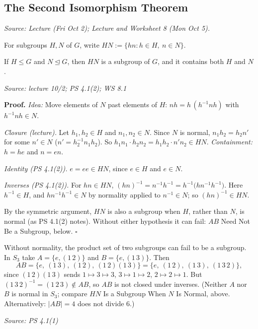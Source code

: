\documentclass[11pt]{report}
\renewenvironment{proof}[1][Proof]{\noindent\textbf{#1.} }{\hfill$\square$\par\vspace{5pt}}
\newcommand{\srcline}[1]{\par\hfill{\footnotesize\textit{Source: #1}}}
\begin{document}
\subsection{The Second Isomorphism Theorem}\label{sub:second-iso}

\textit{Source: Lecture (Fri Oct 2); Lecture and Worksheet 8 (Mon Oct 5).}

\begin{defbox}\label{def:product-set-hn}
For subgroups $H, N$ of $G$, write $HN := \{hn : h \in H,\ n \in N\}$.
\end{defbox}

\begin{lembox}\label{lem:hn-subgroup-when-n-normal}
If $H \leq G$ and $N \trianglelefteq G$, then $HN$ is a subgroup of $G$, and it contains both $H$ and $N$.
\srcline{lecture 10/2; PS 4.1(2); WS 8.1}
\end{lembox}

\begin{proof}
\textit{Idea:} Move elements of $N$ past elements of $H$: $nh = h\,(h^{-1}nh)$ with $h^{-1}nh \in N$.\par
\emph{Closure (lecture).} Let $h_1, h_2 \in H$ and $n_1, n_2 \in N$. Since $N$ is normal, $n_1h_2 = h_2n'$ for some $n' \in N$ ($n' = h_2^{-1}n_1h_2$). So $h_1n_1 \cdot h_2n_2 = h_1h_2 \cdot n'n_2 \in HN$. \emph{Containment:} $h = he$ and $n = en$.

\emph{Identity (PS 4.1(2)).} $e = ee \in HN$, since $e \in H$ and $e \in N$.

\emph{Inverses (PS 4.1(2)).} For $hn \in HN$, $(hn)^{-1} = n^{-1}h^{-1} = h^{-1}\big(hn^{-1}h^{-1}\big)$. Here $h^{-1} \in H$, and $hn^{-1}h^{-1} \in N$ by normality applied to $n^{-1} \in N$; so $(hn)^{-1} \in HN$.

By the symmetric argument, $HN$ is also a subgroup when $H$, rather than $N$, is normal (as PS 4.1(2) notes). Without either hypothesis it can fail: $AB$ Need Not Be a Subgroup, below.
\end{proof}

\begin{exbox}\label{ex:ab-need-not-subgroup}
Without normality, the product set of two subgroups can fail to be a subgroup. In $S_3$ take $A = \{e, (1\,2)\}$ and $B = \{e, (1\,3)\}$. Then
\[ AB = \{e,\ (1\,3),\ (1\,2),\ (1\,2)(1\,3)\} = \{e,\ (1\,2),\ (1\,3),\ (1\,3\,2)\}, \]
since $(1\,2)(1\,3)$ sends $1 \mapsto 3 \mapsto 3$, $3 \mapsto 1 \mapsto 2$, $2 \mapsto 2 \mapsto 1$. But $(1\,3\,2)^{-1} = (1\,2\,3) \notin AB$, so $AB$ is not closed under inverses. (Neither $A$ nor $B$ is normal in $S_3$; compare $HN$ Is a Subgroup When $N$ Is Normal, above. Alternatively: $|AB| = 4$ does not divide $6$.)
\srcline{PS 4.1(1)}
\end{exbox}
\end{document}
